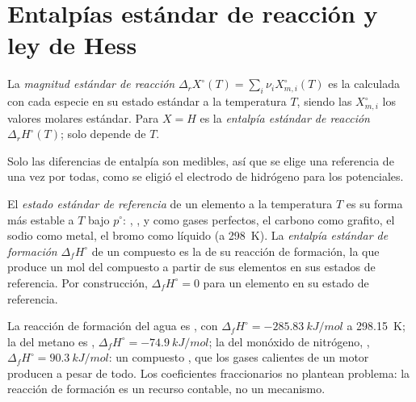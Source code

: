 \section{Entalpías estándar de reacción y ley de Hess}

\begin{definition}\label{def:b2:reaction-enthalpy:standard-reaction-enthalpy}
La \emph{magnitud estándar de reacción}
$\Delta_r X^\circ(T) = \sum_i\nu_iX_{m,i}^\circ(T)$ es la 
calculada con cada especie en su estado estándar a la temperatura $T$, siendo las
$X_{m,i}^\circ$ los valores molares estándar. Para $X = H$ es la
\emph{entalpía estándar de reacción}
$\Delta_r H^\circ(T)$; solo depende de $T$.
\end{definition}

Solo las diferencias de entalpía son medibles, así que se elige una referencia de una vez
por todas, como se eligió el electrodo de hidrógeno para los potenciales.

\begin{definition}\label{def:b2:reaction-enthalpy:formation}
El \emph{estado estándar de referencia} de un
elemento a la temperatura $T$ es su forma más estable a $T$ bajo $p^\circ$:
, ,  y  como gases perfectos, el carbono como
grafito, el sodio como metal, el bromo como líquido (a \qty{298}{K}).
La \emph{entalpía estándar de formación}
$\Delta_f H^\circ$ de un compuesto es la 
de su reacción de formación, la que produce un mol del
compuesto a partir de sus elementos en sus estados de referencia. Por construcción,
$\Delta_f H^\circ = 0$ para un elemento en su estado de referencia.
\end{definition}

\begin{example}\label{ex:b2:reaction-enthalpy:formation}
La reacción de formación del agua es , con
$\Delta_f H^\circ = \qty{-285.83}{kJ/mol}$ a \qty{298.15}{K}; la del
metano es , $\Delta_f H^\circ =
\qty{-74.9}{kJ/mol}$; la del monóxido de nitrógeno, , $\Delta_f H^\circ = \qty{+90.3}{kJ/mol}$: un compuesto ,
que los gases calientes de un motor producen a pesar de todo. Los coeficientes
fraccionarios no plantean problema: la reacción de formación es un recurso
contable, no un mecanismo.
\end{example}

